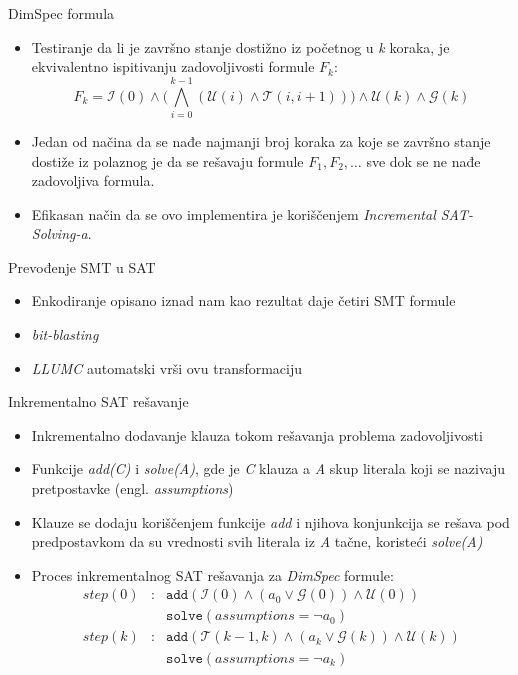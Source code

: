 \documentclass{beamer}
\begin{document}
\begin{frame}{DimSpec formula}
    \begin{itemize}
        \item Testiranje da li je završno stanje dostižno iz početnog u \emph{k} koraka, je ekvivalentno ispitivanju zadovoljivosti formule $F_{k}$:
        \begin{displaymath}
            F_{k} = \mathcal{I}(0) \wedge \Bigg( \bigwedge_{i=0}^{k-1}{(\mathcal{U}(i) \wedge \mathcal{T}(i, i+1))} \Bigg) \wedge \mathcal{U}(k) \wedge \mathcal{G}(k)
        \end{displaymath}
        \item Jedan od načina da se nađe najmanji broj koraka za koje se završno stanje dostiže iz polaznog je da se rešavaju formule $F_{1}, F_{2}, \dots$ sve dok se ne nađe zadovoljiva formula.
        \item Efikasan način da se ovo implementira je koriščenjem \emph{Incremental SAT-Solving-a}.
    \end{itemize}
\end{frame}

\begin{frame}{Prevođenje SMT u SAT}
    \begin{itemize}
        \item Enkodiranje opisano iznad nam kao rezultat daje četiri SMT formule
        \item \emph{bit-blasting}
        \item \emph{LLUMC} automatski vrši ovu transformaciju
    \end{itemize}
\end{frame}

\begin{frame}{Inkrementalno SAT rešavanje}
    \begin{itemize}
        \item Inkrementalno dodavanje klauza tokom rešavanja problema zadovoljivosti
        \item Funkcije \emph{add(C)} i \emph{solve(A)}, gde je \emph{C} klauza a \emph{A} skup literala koji se nazivaju pretpostavke (engl. \emph{assumptions})
        \item Klauze se dodaju koriščenjem funkcije \emph{add} i njihova konjunkcija se rešava pod predpostavkom da su vrednosti svih literala iz \emph{A} tačne, koristeći \emph{solve(A)}
        \item Proces inkrementalnog SAT rešavanja za \emph{DimSpec} formule:
            $$\begin{array}{rcl}
            step(0) & : & \texttt{add}(\mathcal{I}(0) \wedge (a_{0} \vee \mathcal{G}(0)) \wedge \mathcal{U}(0)) \\
                &   & \texttt{solve}(assumptions = \neg{a_{0}}) \\
            step(k) & : & \texttt{add}(\mathcal{T}(k - 1, k) \wedge (a_{k} \vee \mathcal{G}(k)) \wedge \mathcal{U}(k)) \\
                &   & \texttt{solve}(assumptions = \neg{a_{k}})
            \end{array}$$
    \end{itemize}
\end{frame}
\end{document}
